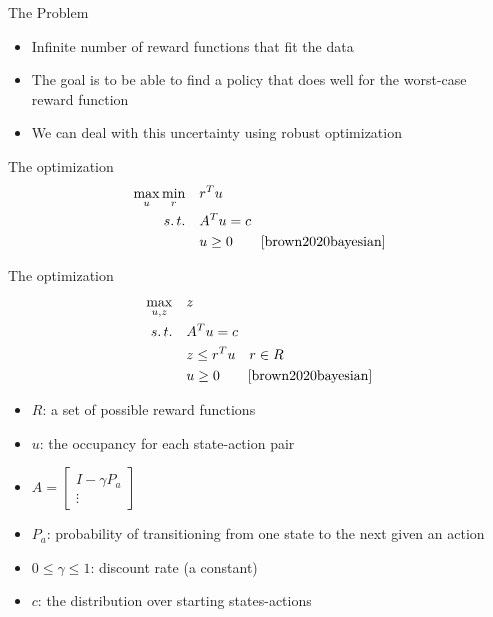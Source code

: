 \documentclass[9pt]{beamer}
\begin{document}
\begin{frame}{The Problem}
    \begin{itemize}
        \item Infinite number of reward functions that fit the data
        \vfill
        \item The goal is to be able to find a policy that does well for the worst-case reward function
        \vfill
        \item We can deal with this uncertainty using robust optimization
    \end{itemize}
\end{frame}

\begin{frame}{The optimization }
\begin{equation}
\begin{aligned}
\max_{u} \min_{r} \quad & r^Tu \\
s.\,t.\quad & A^T u = c \\
& u \ge 0 \quad \quad\cite{brown2020bayesian}
\end{aligned}
\end{equation}
\end{frame}    




\begin{frame}{The optimization}
    \begin{equation}
\begin{aligned}
\max_{u,z}\quad & z \\
s.\,t.\quad & A^T u = c \\
&z \le r^Tu \quad r \in R \\
& u \ge 0\quad \quad \cite{brown2020bayesian}
\end{aligned}
\end{equation}


\begin{itemize}
    \item $R$: a set of possible reward functions
    \item $u$: the occupancy for each state-action pair
    \item $A = \begin{bmatrix}I - \gamma P_a\\ \vdots \end{bmatrix}$
    \item $P_a$: probability of transitioning from one state to the next given an action
    \item $0 \le \gamma \le 1$: discount rate (a constant)
    \item $c$: the distribution over starting states-actions
\end{itemize}
\end{frame}
\end{document}
